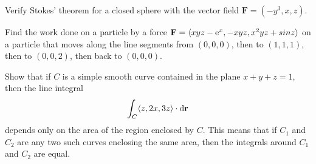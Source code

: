 \documentclass[prettycode,shellescape]{watsonbook}
\begin{document}
\begin{aexercise}
  Verify Stokes' theorem for a closed sphere with the vector field
  $\mathbf{F} = (-y^3,x,z)$. 
\end{aexercise}

\begin{aexercise}
  Find the work done on a particle by a force
  $\mathbf{F}=\langle xyz-\mathrm{e}^x, -xyz, x^2yz+sin z \rangle$ on a
  particle that moves along the line segments from $(0, 0, 0)$, then
  to $(1, 1, 1)$, then to $(0, 0, 2)$, then back to $(0, 0, 0)$.
\end{aexercise}

\begin{aexercise}
  Show that if $C$ is a simple smooth curve contained in the plane
  $x+y+z = 1$, then the line integral
  \[\int_C \langle z, 2x, 3z \rangle \cdot \mathrm{d}\mathbf{r}\]
  depends only on the area of the region enclosed by $C$. This means
  that if $C_1$ and $C_2$ are any two such curves enclosing the same
  area, then the integrals around $C_1$ and $C_2$ are equal.
\end{aexercise} 
\end{document}
